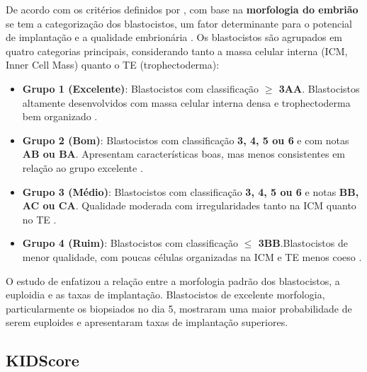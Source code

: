 De acordo com os critérios definidos por , com base na \textbf{morfologia do embrião} se tem a categorização dos blastocistos, um fator determinante para o potencial de implantação e a qualidade embrionária \cite{capalbo2014}. Os blastocistos são agrupados em quatro categorias principais, considerando tanto a massa celular interna (ICM, Inner Cell Mass) quanto o TE (trophectoderma):
\begin{itemize}
  \item \textbf{Grupo 1 (Excelente)}: Blastocistos com classificação  \textbf{$\geq$ 3AA}. Blastocistos altamente desenvolvidos com massa celular interna densa e trophectoderma bem organizado \cite{capalbo2014}.
  \item \textbf{Grupo 2 (Bom)}: Blastocistos com classificação \textbf{3, 4, 5 ou 6} e com notas \textbf{AB ou BA}. Apresentam características boas, mas menos consistentes em relação ao grupo excelente \cite{capalbo2014}.
  \item \textbf{Grupo 3 (Médio)}: Blastocistos com classificação \textbf{3, 4, 5 ou 6} e notas \textbf{BB, AC ou CA}. Qualidade moderada com irregularidades tanto na ICM quanto no TE \cite{capalbo2014}.
  \item \textbf{Grupo 4 (Ruim)}: Blastocistos com classificação \textbf{$\leq$ 3BB}.Blastocistos de menor qualidade, com poucas células organizadas na ICM e TE menos coeso \cite{capalbo2014}.
\end{itemize}
O estudo de  enfatizou a relação entre a morfologia padrão dos blastocistos, a euploidia e as taxas de implantação. Blastocistos de excelente morfologia, particularmente os biopsiados no dia 5, mostraram uma maior probabilidade de serem euploides e apresentaram taxas de implantação superiores.

\subsection{KIDScore\texttrademark}  

